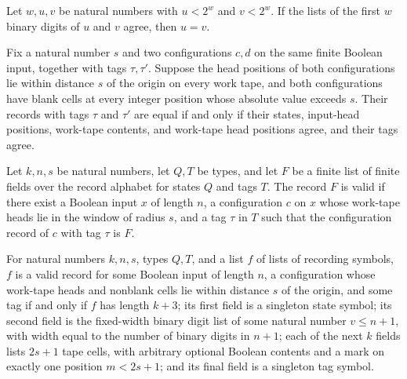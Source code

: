 \begin{theorem}
\label{Turing.record_digits_inj}
\leanok
{}
Let $w,u,v$ be natural numbers with $u<2^w$ and $v<2^w$. If the lists of the first $w$
binary digits of $u$ and $v$ agree, then $u=v$.
\end{theorem}

\begin{theorem}
\label{Turing.cfgRecord_inj}
\leanok
{}
Fix a natural number $s$ and two configurations $c,d$ on the same finite Boolean input,
together with tags $\tau,\tau'$. Suppose the head positions of both configurations lie
within distance $s$ of the origin on every work tape, and both configurations have blank
cells at every integer position whose absolute value exceeds $s$. Their records with
tags $\tau$ and $\tau'$ are equal if and only if their states, input-head positions,
work-tape contents, and work-tape head positions agree, and their tags agree.
\end{theorem}

\begin{definition}
\label{Turing.RecordValid}
\leanok
{}
Let $k,n,s$ be natural numbers, let $Q,T$ be types, and let $F$ be a finite list of
finite fields over the record alphabet for states $Q$ and tags $T$. The record $F$ is
valid if there exist a Boolean input $x$ of length $n$, a configuration $c$ on $x$ whose
work-tape heads lie in the window of radius $s$, and a tag $\tau$ in $T$ such that the
configuration record of $c$ with tag $\tau$ is $F$.
\end{definition}

\begin{theorem}
\label{Turing.recordValid_iff}
\leanok
{}
For natural numbers $k,n,s$, types $Q,T$, and a list $f$ of lists of recording symbols,
$f$ is a valid record for some Boolean input of length $n$, a configuration whose
work-tape heads and nonblank cells lie within distance $s$ of the origin, and some tag
if and only if $f$ has length $k+3$; its first field is a singleton state symbol; its
second field is the fixed-width binary digit list of some natural number $v\le n+1$,
with width equal to the number of binary digits in $n+1$; each of the next $k$ fields
lists $2s+1$ tape cells, with arbitrary optional Boolean contents and a mark on exactly
one position $m<2s+1$; and its final field is a singleton tag symbol.
\end{theorem}

